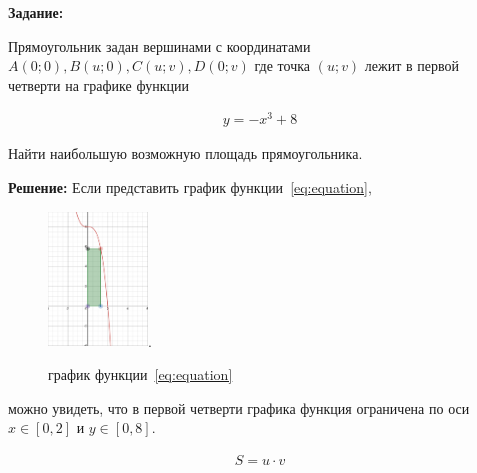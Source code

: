 {}\documentclass{article}
\begin{document}
\textbf{Задание:}

Прямоугольник задан вершинами с координатами \(A(0;0), B(u;0), C(u;v), D(0;v)\)
где точка \((u; v)\) лежит в первой четверти на графике функции

\begin{align}
    y = -x^3 + 8
    \label{eq:equation}
\end{align}

Найти наибольшую возможную площадь прямоугольника.

\textbf{Решение:}
Если представить график функции~\eqref{eq:equation},

\begin{figure}[h]
    \centering
    \includegraphics[width=100]{img1}.
    \caption{график функции~\eqref{eq:equation}}
    \label{fig:figure}
\end{figure}

можно увидеть, что в первой четверти графика функция ограничена по оси \(x \in [0,2]\) и \(y \in [0,8]\).

\begin{align}
    S = u \cdot v
    \label{eq:space}
\end{align}
\end{document}
